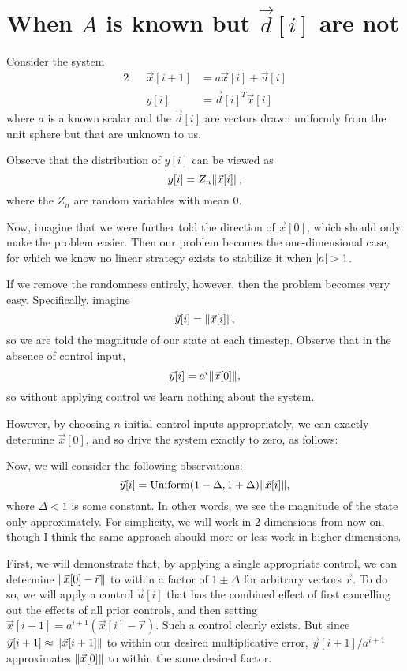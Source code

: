 \documentclass[letterpaper]{article}
\theoremstyle{remark}
\newcommand\note[1]{\marginpar{\textcolor{red}{#1}}}
\newcommand{\eqn}[1]{\begin{alignat*}{2}#1\end{alignat*}}
\begin{document}
\section*{When $A$ is known but $\vec{d}[i]$ are not}
Consider the system
\eqn{
    && \vec{x}[i + 1] &= a\vec{x}[i] + \vec{u}[i] \\
    && y[i] &= \vec{d}[i]^T \vec{x}[i]
}
where $a$ is a known scalar and the $\vec{d}[i]$ are vectors drawn uniformly from the unit sphere but that are unknown to us.

Observe that the distribution of $y[i]$ can be viewed as
\[
    y[i] = Z_n \norm{\vec{x}[i]},
\]
where the $Z_n$ are random variables with mean $0$.

Now, imagine that we were further told the direction of $\vec{x}[0]$, which should only make the problem easier. Then our problem becomes the one-dimensional case, for which we know no linear strategy exists to stabilize it when $\abs{a} > 1$.

If we remove the randomness entirely, however, then the problem becomes very easy. Specifically, imagine
\[
    \vec{y}[i] = \norm{\vec{x}[i]},
\]
so we are told the magnitude of our state at each timestep. Observe that in the absence of control input, 
\[
    \vec{y}[i] = a^i\norm{\vec{x}[0]},
\]
so without applying control we learn nothing about the system.

However, by choosing $n$ initial control inputs appropriately, we can exactly determine $\vec{x}[0]$, and so drive the system exactly to zero, as follows:
\note{Diagram}

Now, we will consider the following observations:
\[
    \vec{y}[i] = \text{Uniform}(1 - \Delta, 1 + \Delta) \norm{\vec{x}[i]},
\]
where $\Delta < 1$ is some constant. In other words, we see the magnitude of the state only approximately. For simplicity, we will work in $2$-dimensions from now on, though I think the same approach should more or less work in higher dimensions.

First, we will demonstrate that, by applying a single appropriate control, we can determine $\norm{\vec{x}[0] - \vec{r}}$ to within a factor of $1 \pm \Delta$ for arbitrary vectors $\vec{r}$. To do so, we will apply a control $\vec{u}[i]$ that has the combined effect of first cancelling out the effects of all prior controls, and then setting $\vec{x}[i + 1] = a^{i + 1}(\vec{x}[i] - \vec{r})$. Such a control clearly exists. But since $\vec{y}[i + 1] \approx \norm{\vec{x}[i + 1]}$ to within our desired multiplicative error, $\vec{y}[i + 1] / a^{i + 1}$ approximates $\norm{\vec{x}[0]}$ to within the same desired factor.
\end{document}
